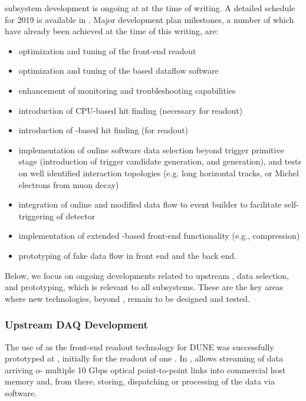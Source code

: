  subsystem development is ongoing at  at the time of
writing. A detailed schedule for 2019 is available
in \cite{bib:docdb14095}. Major development plan milestones, a number
of which have already been achieved at the time of this writing, are:
\begin{itemize}
\item optimization and tuning of the front-end readout
\item optimization and tuning of the  based dataflow software
\item enhancement of monitoring and troubleshooting capabilities
\item introduction of CPU-based hit finding (necessary for  readout)
\item introduction of -based hit finding (for  readout)
\item implementation of online software data selection beyond trigger
primitive stage (introduction of trigger candidate generation, and
 generation), and tests on well identified interaction
topologies (e.g. long horizontal tracks, or Michel electrons from muon decay)
\item integration of online  and modified data flow to event
builder to facilitate self-triggering of detector
\item implementation of extended -based front-end functionality
(e.g., compression)
\item prototyping of fake  data flow in front end and the back end.
\end{itemize}

Below, we focus on ongoing developments related to upstream ,
data selection, and  prototyping, which is relevant to all  subsystems. These are the key areas where new technologies, beyond , remain to be designed and tested.


\subsubsection{Upstream DAQ Development}

The use of  as the front-end readout technology for DUNE was
successfully prototyped at , initially for the readout of one
. In ,  allows streaming of data arriving o- multiple 10
Gbps optical point-to-point links into commercial host memory and,
from there, storing, dispatching or processing of the data via
software. 

